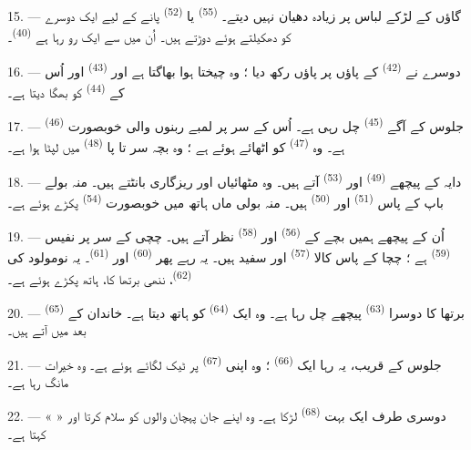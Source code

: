 15. --- گاؤں کے لڑکے لباس پر زیادہ دھیان نہیں دیتے۔
 \textsuperscript{(55)} یا 
\textsuperscript{(52)} پانے کے لیے ایک دوسرے کو دھکیلتے ہوئے دوڑتے
ہیں۔ اُن میں سے ایک رو رہا ہے \textsuperscript{(40)}۔

16. --- دوسرے نے  \textsuperscript{(42)} کے پاؤں پر پاؤں
رکھ دیا ؛ وہ چیختا ہوا بھاگتا ہے اور 
\textsuperscript{(43)} اور اُس کے  \textsuperscript{(44)}
کو بھگا دیتا ہے۔

\VUsaut{5.0mm}
\VUsaut{4.0mm}

17. --- جلوس کے آگے  \textsuperscript{(45)} چل رہی ہے۔
اُس کے سر پر لمبے ربنوں والی خوبصورت 
\textsuperscript{(46)} ہے۔ وہ  \textsuperscript{(47)}
کو اٹھائے ہوئے ہے ؛ وہ بچہ سر تا پا 
\textsuperscript{(48)} میں لپٹا ہوا ہے۔

18. --- دایہ کے پیچھے  \textsuperscript{(49)} اور
 \textsuperscript{(53)} آتے ہیں۔ وہ مٹھائیاں اور
ریزگاری بانٹتے ہیں۔ منہ بولے باپ کے پاس 
\textsuperscript{(51)} اور  \textsuperscript{(50)}
ہیں۔ منہ بولی ماں ہاتھ میں خوبصورت 
\textsuperscript{(54)} پکڑے ہوئے ہے۔

19. --- اُن کے پیچھے ہمیں بچے کے  \textsuperscript{(56)}
اور  \textsuperscript{(58)} نظر آتے ہیں۔ چچی کے سر پر
نفیس  \textsuperscript{(59)} ہے ؛ چچا کے پاس کالا
 \textsuperscript{(57)} اور سفید  ہیں۔
یہ رہے پھر  \textsuperscript{(60)} اور
 \textsuperscript{(61)}۔ یہ نومولود کی
 \textsuperscript{(62)}، ننھی برتھا کا، ہاتھ پکڑے ہوئے
ہے۔

20. --- برتھا کا دوسرا  \textsuperscript{(63)} پیچھے چل
رہا ہے۔ وہ ایک  \textsuperscript{(64)} کو ہاتھ دیتا
ہے۔ خاندان کے  \textsuperscript{(65)} بعد میں آتے ہیں۔

\VUsaut{4.6mm}
\VUsaut{3.4mm}

21. --- جلوس کے قریب، یہ رہا ایک  \textsuperscript{(66)} ؛
وہ اپنی  \textsuperscript{(67)} پر ٹیک لگائے ہوئے ہے۔
وہ خیرات مانگ رہا ہے۔

22. --- دوسری طرف ایک بہت  \textsuperscript{(68)} لڑکا
ہے۔ وہ اپنے جان پہچان والوں کو سلام کرتا اور «  » کہتا ہے۔

